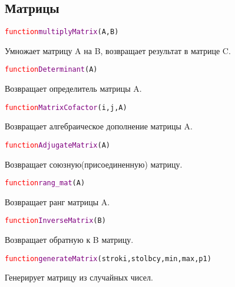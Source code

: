 \documentclass[a4paper,12pt]{article}
\begin{document}
		\subsection{Матрицы}
			\begin{alltt} 	
				\textcolor{Red}{function} \textcolor{Purple}{multiplyMatrix}(A,B)
			\end{alltt}
		Умножает матрицу A на B, возвращает результат в матрице C.
			\begin{alltt} 	
				\textcolor{Red}{function} \textcolor{Purple}{Determinant}(A)
			\end{alltt}
		Возвращает определитель матрицы A.
			\begin{alltt} 
				\textcolor{Red}{function} \textcolor{Purple}{MatrixCofactor}(i,j,A)
			\end{alltt}
		Возвращает алгебраическое дополнение матрицы A.
			\begin{alltt} 
				\textcolor{Red}{function} \textcolor{Purple}{AdjugateMatrix}(A)
			\end{alltt}
		Возвращает союзную(присоединенную) матрицу.
			\begin{alltt} 	
				\textcolor{Red}{function} \textcolor{Purple}{rang_mat}(А)
			\end{alltt}
		Возвращает ранг матрицы A.
			\begin{alltt} 	
				\textcolor{Red}{function} \textcolor{Purple}{InverseMatrix}(B)
			\end{alltt}
		Возвращает обратную  к B матрицу.
			\begin{alltt} 	
				\textcolor{Red}{function} \textcolor{Purple}{generateMatrix}(stroki,stolbcy,min,max,p1)
			\end{alltt}
		Генерирует матрицу из случайных чисел.
\end{document}
